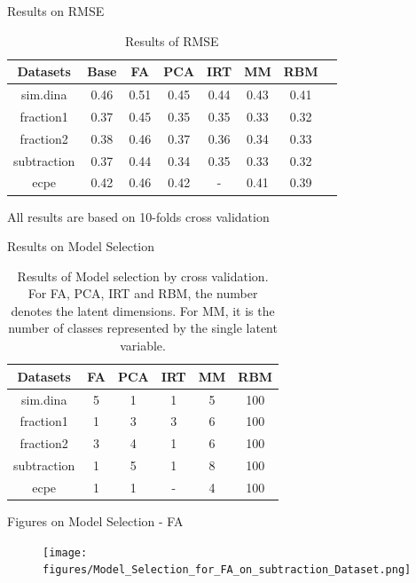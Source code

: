 \documentclass[handout]{beamer}
\begin{document}
\begin{frame}{Results on RMSE}
\begin{table}[!h]
\begin{center}
\begin{tabular}{|c|c|c|c|c|c|c|c|}
\hline
Datasets & Base & FA & PCA & IRT & MM & RBM\\
\hline
sim.dina & 0.46 & 0.51 & 0.45 & 0.44 & 0.43 & 0.41\\
\hline
fraction1 & 0.37 & 0.45 & 0.35 & 0.35 & 0.33 & 0.32\\
\hline
fraction2 & 0.38 & 0.46 & 0.37 & 0.36 & 0.34 & 0.33\\
\hline
subtraction & 0.37 & 0.44 & 0.34 & 0.35 & 0.33 & 0.32\\
\hline
ecpe & 0.42 & 0.46 & 0.42 & - & 0.41 & 0.39\\
\hline
\end{tabular}
\end{center}
\caption{Results of RMSE}\label{tab:results}
\end{table}
All results are based on 10-folds cross validation
\end{frame}

\begin{frame}{Results on Model Selection}
\begin{table}[!h]
\begin{center}
\begin{tabular}{|c|c|c|c|c|c|}
\hline
Datasets & FA & PCA & IRT & MM & RBM\\
\hline
sim.dina & 5 & 1 & 1 & 5 & 100\\
\hline
fraction1 & 1 & 3 & 3 & 6 & 100\\
\hline
fraction2 & 3 & 4 & 1 & 6 & 100\\
\hline
subtraction & 1 & 5 & 1 & 8 & 100\\
\hline
ecpe & 1 & 1 & - & 4 & 100\\
\hline
\end{tabular}
\end{center}
\caption{Results of Model selection by cross validation. For FA, PCA, IRT and RBM, the number denotes the latent dimensions. For MM, it is the number of classes represented by the single latent variable.}\label{tab:Model}
\end{table}
\end{frame}

\begin{frame}{Figures on Model Selection - FA}
\begin{figure}[H]
\centering
	\texttt{[image: figures/Model\_Selection\_for\_FA\_on\_subtraction\_Dataset.png]}
	\label{fig:FA}
\end{figure}
\end{frame}
\end{document}
